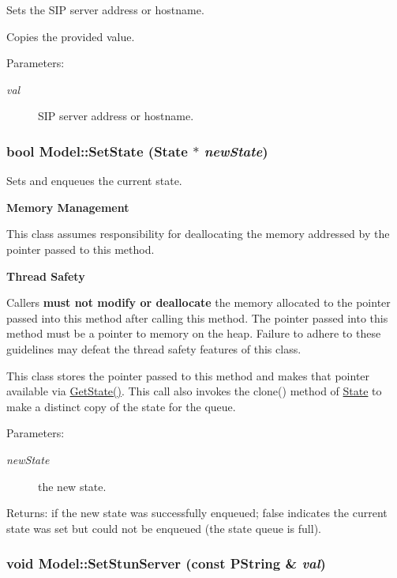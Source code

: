 Sets the SIP server address or hostname. 

Copies the provided value. \begin{Desc}
\item[Parameters:]
\begin{description}
\item[{\em val}]SIP server address or hostname. \end{description}
\end{Desc}
\hypertarget{classModel_8b2d324213cf67b2e139144a25c6e3c3}{
\subsubsection[{SetState}]{\setlength{\rightskip}{0pt plus 5cm}bool Model::SetState ({\bf State} $\ast$ {\em newState})}}
\label{classModel_8b2d324213cf67b2e139144a25c6e3c3}


Sets and enqueues the current state. 

{\bf Memory Management} 

This class assumes responsibility for deallocating the memory addressed by the pointer passed to this method. 

{\bf Thread Safety} 

Callers {\bf must not modify or deallocate} the memory allocated to the pointer passed into this method after calling this method. The pointer passed into this method must be a pointer to memory on the heap. Failure to adhere to these guidelines may defeat the thread safety features of this class. 

This class stores the pointer passed to this method and makes that pointer available via \hyperlink{classModel_aca96bcd2e019aad9c4d4d7203b77cce}{GetState()}. This call also invokes the clone() method of \hyperlink{classState}{State} to make a distinct copy of the state for the queue.  \begin{Desc}
\item[Parameters:]
\begin{description}
\item[{\em newState}]the new state. \end{description}
\end{Desc}
\begin{Desc}
\item[Returns:]if the new state was successfully enqueued; false indicates the current state was set but could not be enqueued (the state queue is full). \end{Desc}
\hypertarget{classModel_d45dc4b460f571d748905f1c19e88577}{
\subsubsection[{SetStunServer}]{\setlength{\rightskip}{0pt plus 5cm}void Model::SetStunServer (const PString \& {\em val})}}
\label{classModel_d45dc4b460f571d748905f1c19e88577}


